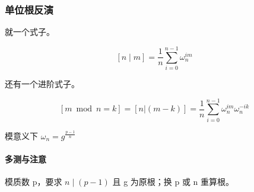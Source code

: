 \subsubsection{单位根反演}
就一个式子。

$$[n\mid m]=\frac{1}{n}\sum_{i=0}^{n-1}\omega_{n}^{im}$$

还有一个进阶式子。

$$[m \bmod n=k]=[n|(m-k)]=\frac{1}{n}\sum_{i=0}^{n-1}\omega_{n}^{im}\omega_{n}^{-ik}$$

模意义下 $\omega_{n}=g^{\frac{p-1}{n}}$

\paragraph{多测与注意} 模质数 p，要求 $n\mid(p-1)$ 且 g 为原根；换 p 或 n 重算根。
